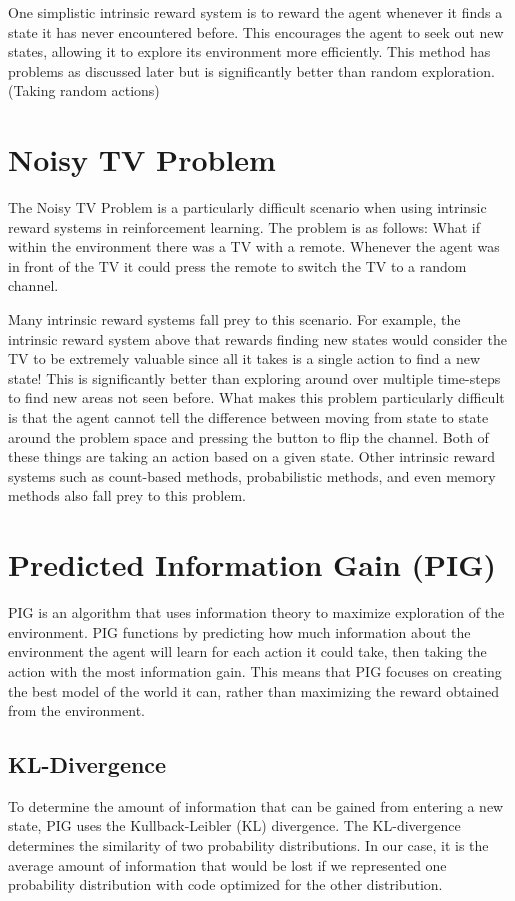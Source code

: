 \documentclass[12pt]{thesis}
\begin{document}
One simplistic intrinsic reward system is to reward the agent whenever it finds a state it has never encountered before.  \cite{DBLP:journals/corr/TangHFSCDSTA16} This encourages the agent to seek out new states, allowing it to explore its environment more efficiently. This method has problems as discussed later but is significantly better than random exploration. (Taking random actions)

\section{Noisy TV Problem}
The Noisy TV Problem is a particularly difficult scenario when using intrinsic reward systems in reinforcement learning. \cite{DBLP:journals/corr/abs-2008-04388} The problem is as follows: What if within the environment there was a TV with a remote. Whenever the agent was in front of the TV it could press the remote to switch the TV to a random channel.

Many intrinsic reward systems fall prey to this scenario. For example, the intrinsic reward system above that rewards finding new states would consider the TV to be extremely valuable since all it takes is a single action to find a new state! This is significantly better than exploring around over multiple time-steps to find new areas not seen before. What makes this problem particularly difficult is that the agent cannot tell the difference between moving from state to state around the problem space and pressing the button to flip the channel. Both of these things are taking an action based on a given state. Other intrinsic reward systems such as count-based methods, probabilistic methods, and even memory methods also fall prey to this problem.  \cite{DBLP:journals/corr/abs-1908-06976}

\section{Predicted Information Gain (PIG)}
PIG is an algorithm that uses information theory to maximize exploration of the environment. \cite{10.3389/fncir.2013.00037} PIG functions by predicting how much information about the environment the agent will learn for each action it could take, then taking the action with the most information gain. This means that PIG focuses on creating the best model of the world it can, rather than maximizing the reward obtained from the environment.

\subsection{KL-Divergence}
To determine the amount of information that can be gained from entering a new state, PIG uses the Kullback-Leibler (KL) divergence. The KL-divergence determines the similarity of two probability distributions. In our case, it is the average amount of information that would be lost if we represented one probability distribution with code optimized for the other distribution.
\end{document}
